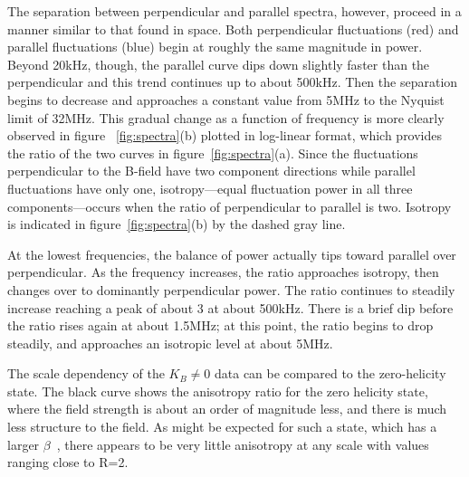 \documentclass[aip,prl,amsmath,amssymb,reprint,superscriptaddress]{revtex4-1} %
\begin{document}
The separation between perpendicular and parallel spectra, however, proceed in a manner similar to that found in space. Both perpendicular fluctuations (red) and parallel fluctuations (blue) begin at roughly the same magnitude in power. Beyond 20kHz, though, the parallel curve dips down slightly faster than the perpendicular and this trend continues up to about 500kHz. Then the separation begins to decrease and approaches a constant value from 5MHz to the Nyquist limit of 32MHz. This gradual change as a function of frequency is more clearly observed in figure ~\ref{fig:spectra}(b) plotted in log-linear format, which provides the ratio of the two curves in figure~\ref{fig:spectra}(a). Since the fluctuations perpendicular to the B-field have two component directions while parallel fluctuations have only one, isotropy---equal fluctuation power in all three components---occurs when the ratio of perpendicular to parallel is two. Isotropy is indicated in figure~\ref{fig:spectra}(b) by the dashed gray line.

At the lowest frequencies, the balance of power actually tips toward parallel over perpendicular. As the frequency increases, the ratio approaches isotropy, then changes over to dominantly perpendicular power. The ratio continues to steadily increase reaching a peak of about 3 at about 500kHz. There is a brief dip before the ratio rises again at about 1.5MHz; at this point, the ratio begins to drop steadily, and approaches an isotropic level at about 5MHz. 

The scale dependency of the $K_{B}\neq 0$ data can be compared to the zero-helicity state. The black curve shows the anisotropy ratio for the zero helicity state, where the field strength is about an order of magnitude less, and there is much less structure to the field. As might be expected for such a state, which has a larger $\beta$~\cite{smith06,sarkar14}, there appears to be very little anisotropy at any scale with values ranging close to R=2.
\end{document}
